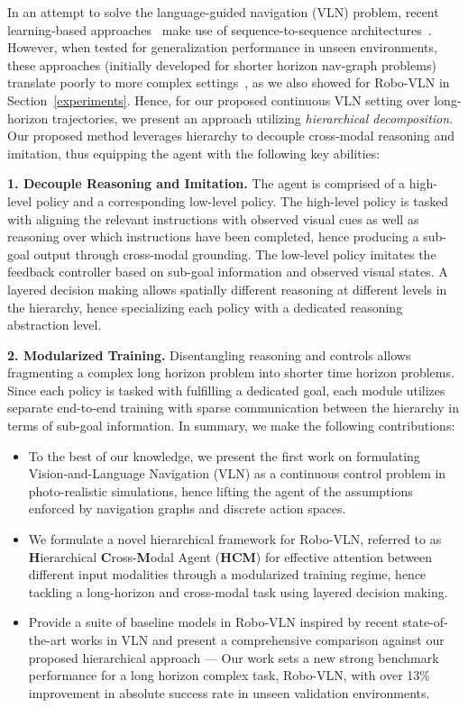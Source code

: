 \documentclass[letter, 10pt, conference]{ieeeconf}
\begin{document}
In an attempt to solve the language-guided navigation (VLN) problem, recent learning-based approaches~\cite{ma2019theregretful, ma2019selfmonitoring, wang2019reinforced} make use of sequence-to-sequence architectures~\cite{10.5555/2969033.2969173}. However, when tested for generalization performance in unseen environments, these approaches (initially developed for shorter horizon nav-graph problems) translate poorly to more complex settings~\cite{ALFRED20,krantz2020navgraph}, as we also showed for Robo-VLN in Section~\ref{experiments}.
Hence, for our proposed continuous VLN setting over long-horizon trajectories, we present an approach utilizing \textit{hierarchical decomposition}. Our proposed method leverages hierarchy to decouple cross-modal reasoning and imitation, thus equipping the agent with the following key abilities: 

\textbf{1. Decouple Reasoning and Imitation.}
The agent is comprised of a high-level policy and a corresponding low-level policy. The high-level policy is tasked with aligning the relevant instructions with observed visual cues as well as reasoning over which instructions have been completed, hence producing a sub-goal output through cross-modal grounding. 
The low-level policy imitates the feedback controller based on sub-goal information and observed visual states. A layered decision making allows spatially different reasoning at different levels in the hierarchy, hence specializing each policy with a dedicated reasoning abstraction level.

\textbf{2. Modularized Training.}
Disentangling reasoning and controls allows fragmenting a complex long horizon problem into shorter time horizon problems.
Since each policy is tasked with fulfilling a dedicated goal, each module utilizes separate end-to-end training with sparse communication between the hierarchy in terms of sub-goal information.
In summary, we make the following contributions: 
\begin{itemize}

\item To the best of our knowledge, we present the first work on formulating Vision-and-Language Navigation (VLN) as a continuous control problem in photo-realistic simulations, hence lifting the agent of the assumptions enforced by navigation graphs and discrete action spaces.

\item We formulate a novel hierarchical framework for Robo-VLN, referred to as \textbf{H}ierarchical \textbf{C}ross-\textbf{M}odal Agent (\textbf{HCM}) for effective attention between different input modalities through a modularized training regime, hence tackling a long-horizon and cross-modal task using layered decision making.
\item Provide a suite of baseline models in Robo-VLN inspired by recent state-of-the-art works in VLN and present a comprehensive comparison against our proposed hierarchical approach --- Our work sets a new strong benchmark performance for a long horizon complex task, Robo-VLN, with over 13\% improvement in absolute success rate in unseen validation environments.


\end{itemize} 
\end{document}
